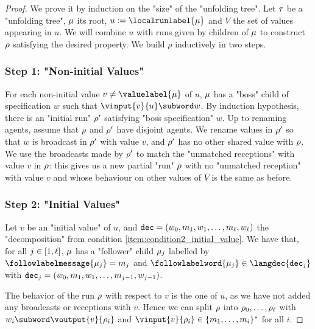 \begin{proof}
We prove it by induction on the "size" of the "unfolding tree".
Let $\tau$ be a "unfolding tree", $\mu$ its root, $u := \localrunlabel{\node}$ and $V$ the set of values appearing in $u$. 
We will combine $u$ with runs given by children of $\mu$ to construct $\rho$ satisfying the desired property. We build $\rho$ inductively in two steps. 

\subsubsection{Step 1: "Non-initial Values"}
\label{sec:tree-to-run-step-one}

For each non-initial value $v \ne \valuelabel{\node}$ of $u$, $\mu$ has a "boss" child of specification $w$ such that $\vinput{v}{u} \subword w$.
By induction hypothesis, there is an "initial run" $\rho'$ satisfying "boss specification" $w$. Up to renaming agents, assume that $\rho$ and $\rho'$ have disjoint agents.
We rename values in $\rho'$ so that $w$ is broadcast in $\rho'$ with value $v$, and $\rho'$ has no other shared value with $\rho$. 
We use the broadcasts made by $\rho'$ to match the "unmatched receptions" with value $v$ in $\rho$: this gives us a new partial "run" $\rho$ with no "unmatched reception" with value $v$ and whose behaviour on other values of $V$ is the same as before.

\subsubsection{Step 2: "Initial Values"}
\label{sec:tree-to-run-step-two}


Let $v$ be an "initial value" of $u$, and $\mathtt{dec} = \\(w_0, m_1, w_1, \ldots, m_\ell, w_\ell)$ the "decomposition" from condition \ref{item:condition2_initial_value}. We have that, for all $j \in [1,\ell]$, $\mu$ has a "follower" child $\mu_j$ labelled by $\followlabelmessage{\node_j} = m_j$ and $\followlabelword{\node_j} \in \langdec{\decsymb_j}$ with $\mathtt{dec}_j = (w_0, m_1, w_1, \ldots, m_{j-1}, w_{j-1})$. 

The behavior of the run $\rho$ with respect to $v$ is the one of $u$, as we have not added any broadcasts or receptions with $v$. Hence we can split $\rho$ into $\rho_0, \ldots, \rho_\ell$ with $w_i \subword \voutput{\aval}{\run_i}$ and $\vinput{\aval}{\run_i} \in \set{m_1, \dots, m_{i}}^*$ for all $i$.


\end{proof}
